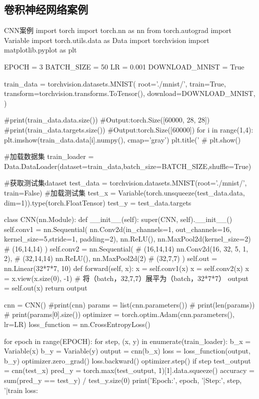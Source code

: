 \documentclass[openbib]{article}
\begin{document}
\subsection{卷积神经网络案例}
\begin{Python}{CNN案例}
	import torch
	import torch.nn as nn
	from torch.autograd import Variable
	import torch.utils.data as Data
	import torchvision
	import matplotlib.pyplot as plt
	
	EPOCH = 3
	BATCH_SIZE = 50
	LR = 0.001
	DOWNLOAD_MNIST = True
	
	train_data = torchvision.datasets.MNIST(
	root='./mnist/',
	train=True,
	transform=torchvision.transforms.ToTensor(),
	download=DOWNLOAD_MNIST,
	)
	
	#print(train_data.data.size())       #Output:torch.Size([60000, 28, 28])
	#print(train_data.targets.size())    #Output:torch.Size([60000])
	for i in range(1,4):
	plt.imshow(train_data.data[i].numpy(), cmap='gray')
	plt.title('%
	#     plt.show()
	
	#加载数据集
	train_loader = Data.DataLoader(dataset=train_data,batch_size=BATCH_SIZE,shuffle=True)
	
	
	#获取测试集dataset
	test_data = torchvision.datasets.MNIST(root='./mnist/', train=False)
	#加载测试集
	test_x = Variable(torch.unsqueeze(test_data.data, dim=1)).type(torch.FloatTensor)
	test_y = test_data.targets
	
	class CNN(nn.Module):
	def __init__(self):
	super(CNN, self).__init__()
	self.conv1 = nn.Sequential(
	nn.Conv2d(in_channels=1, out_channels=16, kernel_size=5,stride=1, padding=2),
	nn.ReLU(),
	nn.MaxPool2d(kernel_size=2) # (16,14,14)
	)
	self.conv2 = nn.Sequential( # (16,14,14)
	nn.Conv2d(16, 32, 5, 1, 2), # (32,14,14)
	nn.ReLU(),
	nn.MaxPool2d(2) # (32,7,7)
	)
	self.out = nn.Linear(32*7*7, 10)
	def forward(self, x):
	x = self.conv1(x)
	x = self.conv2(x)
	x = x.view(x.size(0), -1) # 将（batch，32,7,7）展平为（batch，32*7*7）
	output = self.out(x)
	return output
	
	cnn = CNN()
	#print(cnn)
	params = list(cnn.parameters())
	# print(len(params))
	# print(params[0].size())
	optimizer = torch.optim.Adam(cnn.parameters(), lr=LR)
	loss_function = nn.CrossEntropyLoss()
	
	for epoch in range(EPOCH):
	for step, (x, y) in enumerate(train_loader):
	b_x = Variable(x)
	b_y = Variable(y)
	output = cnn(b_x)
	loss = loss_function(output, b_y)
	optimizer.zero_grad()
	loss.backward()
	optimizer.step()
	if step %
	test_output = cnn(test_x)
	pred_y = torch.max(test_output, 1)[1].data.squeeze()
	accuracy = sum(pred_y == test_y) / test_y.size(0)
	print('Epoch:', epoch, '|Step:', step,
	'|train loss:%
	

\end{Python}
\end{document}
